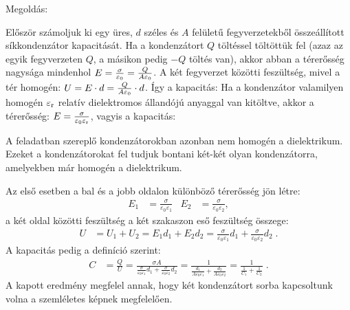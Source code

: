 
\ifdefined\megoldas
  
 Megoldás: 

 Először számoljuk ki egy üres, $d$ széles és $A$ felületű fegyverzetekből összeállított síkkondenzátor kapacitását. Ha a kondenzátort $Q$ töltéssel töltöttük fel (azaz az egyik fegyverzeten $Q$, a másikon pedig $-Q$ töltés van), akkor abban a térerősség nagysága mindenhol $E=\frac{\sigma}{\varepsilon_0}=\frac{Q}{A\varepsilon_0}$. A két fegyverzet közötti feszültség, mivel a tér homogén: $U=E\cdot d=\frac{Q}{A\varepsilon_0}\cdot d$. Így a kapacitás:
 Ha a kondenzátor valamilyen homogén $\varepsilon_\text{r}$ relatív dielektromos állandójú anyaggal van kitöltve, akkor a térerősség: $E=\frac{\sigma}{\varepsilon_0\varepsilon_\text{r}}$, vagyis a kapacitás:

 A feladatban szereplő kondenzátorokban azonban nem homogén a dielektrikum. Ezeket a kondenzátorokat fel tudjuk bontani két-két olyan kondenzátorra, amelyekben már homogén a dielektrikum. 

 Az első esetben a bal és a jobb oldalon különböző térerősség jön létre:
 \begin{align}
  E_1 &= \frac{\sigma}{\varepsilon_0\varepsilon_1} & 
  E_2 &= \frac{\sigma}{\varepsilon_0\varepsilon_2}, 
 \end{align}
a két oldal közötti feszültség a két szakaszon eső feszültség összege:
\begin{align}
  U &= U_1 + U_2 = E_1d_1 + E_2d_2 
    = \frac{\sigma}{\varepsilon_0\varepsilon_1}d_1
     + \frac{\sigma}{\varepsilon_0\varepsilon_2}d_2\;.
\end{align}
 A kapacitás pedig a definíció szerint:
 \begin{align}
  C &= \frac{Q}{U} 
     = \frac{\sigma A}{\frac{\sigma}{\varepsilon_0\varepsilon_1}d_1     + \frac{\sigma}{\varepsilon_0\varepsilon_2}d_2} 
     = \frac{1}{\frac{d_1}{A\varepsilon_0\varepsilon_1}+\frac{d_2}{A\varepsilon_0\varepsilon_2}}
     = \frac{1}{\frac{1}{C_1}+\frac{1}{C_2}}\;.
 \end{align}
A kapott eredmény megfelel annak, hogy két kondenzátort sorba kapcsoltunk volna a szemléletes képnek megfelelően. 


